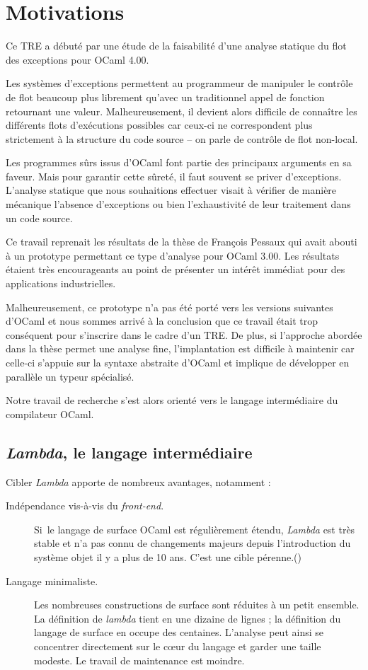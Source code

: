\section{Motivations}

Ce TRE a débuté par une étude de la faisabilité d'une analyse statique du
flot des exceptions pour OCaml 4.00. 

Les systèmes d'exceptions permettent au programmeur de manipuler le contrôle de
flot beaucoup plus librement qu'avec un traditionnel appel de fonction
retournant une valeur. Malheureusement, il devient alors difficile de connaître
les différents flots d'exécutions possibles car ceux-ci ne correspondent plus
strictement à la structure du code source -- on parle de contrôle de flot
non-local.

Les programmes sûrs issus d'OCaml font partie des principaux arguments en sa
faveur. Mais pour garantir cette sûreté, il faut souvent se priver
d'exceptions.  L'analyse statique que nous souhaitions effectuer visait à
vérifier de manière mécanique l'absence d'exceptions ou bien l'exhaustivité de
leur traitement dans un code source.

Ce travail reprenait les résultats de la thèse de François Pessaux
\cite{ExcAnalysis} qui avait abouti à un prototype permettant ce type d'analyse
pour OCaml 3.00.  Les résultats étaient très encourageants au point de
présenter un intérêt immédiat pour des applications industrielles.

Malheureusement, ce prototype n'a pas été porté vers les versions suivantes
d'OCaml et nous sommes arrivé à la conclusion que ce travail était trop
conséquent pour s'inscrire dans le cadre d'un TRE.  De plus, si l'approche
abordée dans la thèse permet une analyse fine, l'implantation est difficile à
maintenir car celle-ci s'appuie sur la syntaxe abstraite d'OCaml et implique de
développer en parallèle un typeur spécialisé.

Notre travail de recherche s'est alors orienté vers le langage intermédiaire du
compilateur OCaml. 

\subsection{\emph{Lambda}, le langage intermédiaire}

Cibler \emph{Lambda} apporte de nombreux avantages, notamment :
\begin{description}
  \item[Indépendance vis-à-vis du \emph{front-end}.] Si le langage de surface
    OCaml est régulièrement étendu, \emph{Lambda} est très stable et n'a pas
    connu de changements majeurs depuis l'introduction du système objet il y a
    plus de 10 ans. C'est une cible pérenne.()
  \item[Langage minimaliste.]
    Les nombreuses constructions de surface sont réduites à un petit ensemble.
		La définition de \emph{lambda} tient en une dizaine de lignes ;
		la définition du langage de surface en occupe des centaines.
    L'analyse peut ainsi se concentrer directement sur le cœur du langage et
    garder une taille modeste. Le travail de maintenance est moindre.
\end{description}

